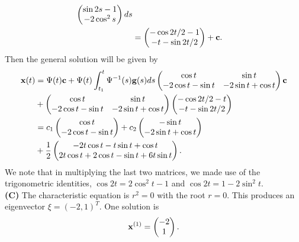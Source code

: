 \documentclass[11pt,a4paper]{article}
\begin{document}
\begin{enumerate}
\begin{align*}
\begin{pmatrix}
				\sin 2s - 1\\
				-2\cos^2s
			\end{pmatrix}ds\\
			&=
			\begin{pmatrix}
				-\cos 2t/2 - 1\\
				-t - \sin 2t/2
			\end{pmatrix}+\vb{c}.
		\end{align*}
		Then the general solution will be given by
		\begin{align*}
			\vb{x}(t)
			&= \Psi(t)\vb{c} + \Psi(t)\int_{t_1}^t \Psi^{-1}(s)\vb{g}(s)ds
			\begin{pmatrix}
				\cos t & \sin t\\
				-2\cos t - \sin t & -2\sin t + \cos t
			\end{pmatrix}\vb{c}\\
			&+
			\begin{pmatrix}
				\cos t & \sin t\\
				-2\cos t - \sin t & -2\sin t + \cos t
			\end{pmatrix}
			\begin{pmatrix}
				-\cos 2t/2 - t\\
				-t - \sin 2t/2
			\end{pmatrix}\\
			&= c_1
			\begin{pmatrix}
				\cos t\\
				-2\cos t - \sin t
			\end{pmatrix} + c_2
			\begin{pmatrix}
				-\sin t\\
				-2\sin t + \cos t
			\end{pmatrix}\\
			&+ \frac{1}{2}
			\begin{pmatrix}
				-2t\cos t - t\sin t + \cos t\\
				2t\cos t + 2\cos t - \sin t + 6t\sin t
			\end{pmatrix}.
		\end{align*}
		We note that in multiplying the last two matrices, we made use of the trigonometric identities, $\cos 2t = 2 \cos^2t - 1$ and $\cos 2t = 1 - 2 \sin^2t$.\\
		\textbf{(C)} The characteristic equation is $r^2 = 0$ with the root $r = 0$. This produces an eigenvector $\xi = (-2, 1)^T$. One solution is
		$$
		\vb{x}^{(1)} =
		\begin{pmatrix}
			-2\\
			1
		\end{pmatrix}.
$$
\end{enumerate}
\end{document}
